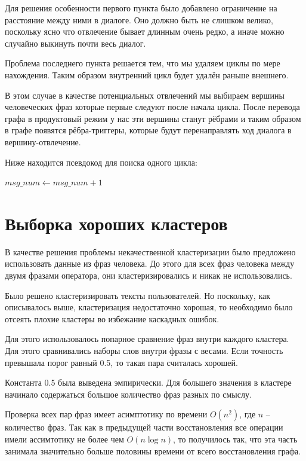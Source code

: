 \documentclass[times,specification,annotation]{itmo-student-thesis}
\begin{document}
	Для решения особенности первого пункта было добавлено ограничение на расстояние между ними в диалоге. Оно должно быть не слишком велико, поскольку ясно что отвлечение бывает длинным очень редко, а иначе можно случайно выкинуть почти весь диалог.
	
	Проблема последнего пункта решается тем, что мы удаляем циклы по мере нахождения. Таким образом внутренний цикл будет удалён раньше внешнего.
	
	В этом случае в качестве потенциальных отвлечений мы выбираем вершины человеческих фраз которые первые следуют после начала цикла. После перевода графа в продуктовый режим у нас эти вершины станут рёбрами и таким образом в графе появятся рёбра-триггеры, которые будут перенаправлять ход диалога в вершину-отвлечение.
	
	Ниже находится псевдокод для поиска одного цикла:
	
	\begin{algorithmic}
		\State $msg\_num \gets msg\_num + 1$
		\EndIf
		\EndFor
		\EndFunction
	\end{algorithmic}
	
	
	\section{Выборка хороших кластеров}
	В качестве решения проблемы некачественной кластеризации было предложено использовать данные из фраз человека. До этого для всех фраз человека между двумя фразами оператора, они кластеризировались и никак не использовались. 
	
	Было решено кластеризировать тексты пользователей. Но поскольку, как описывалось выше, кластеризация недостаточно хорошая, то необходимо было отсеять плохие кластеры во избежание каскадных ошибок.
	
	Для этого использовалось попарное сравнение фраз внутри каждого кластера. Для этого сравнивались наборы слов внутри фразы с весами. Если точность превышала порог равный 0.5, то такая пара считалась хорошей.
	
	Константа 0.5 была выведена эмпирически. Для большего значения в кластере начинало содержаться большое количество фраз разных по смыслу. 
	
	Проверка всех пар фраз имеет асимптотику по времени $O(n^2)$, где $n$ -- количество фраз. Так как в предыдущей части восстановления все операции имели ассимтотику не более чем $O(n \log n)$, то получилось так, что эта часть занимала значительно больше половины времени от всего восстановления графа. 
	
\end{document}
